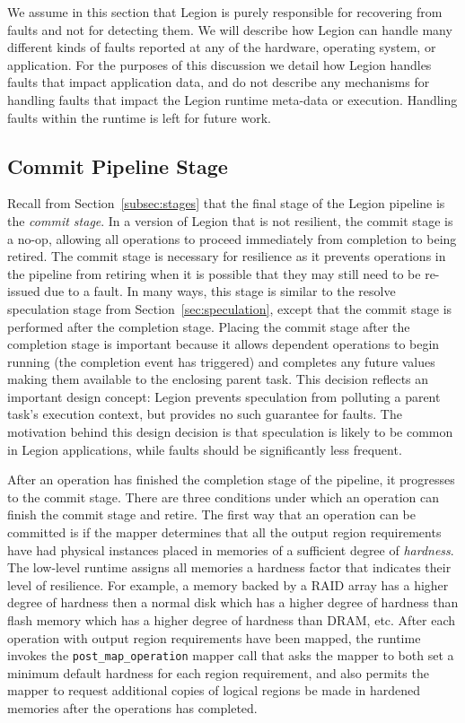 We assume in this section that Legion is purely responsible
for recovering from faults and not for detecting them. We
will describe how Legion can handle many different kinds
of faults reported at any of the hardware, operating system,
or application. For the purposes of this discussion we detail
how Legion handles faults that impact application data, and
do not describe any mechanisms for handling faults that 
impact the Legion runtime meta-data or execution. Handling
faults within the runtime is left for future work.

\subsection{Commit Pipeline Stage}
\label{subsec:commit}
Recall from Section~\ref{subsec:stages} that the final stage
of the Legion pipeline is the {\em commit stage}. In a
version of Legion that is not resilient, the commit stage
is a no-op, allowing all operations to proceed immediately
from completion to being retired. The commit stage is necessary
for resilience as it prevents operations in the pipeline from 
retiring when it is possible that they may still need
to be re-issued due to a fault. In many ways, this stage
is similar to the resolve speculation stage from 
Section~\ref{sec:speculation}, except that the commit stage
is performed after the completion stage. Placing the commit
stage after the completion stage is important because it
allows dependent operations to begin running (the completion
event has triggered) and completes any future values making
them available to the enclosing parent task. This decision
reflects an important design concept: Legion prevents speculation
from polluting a parent task's execution context, but provides
no such guarantee for faults. The motivation behind this
design decision is that speculation is likely to be common
in Legion applications, while faults should be significantly
less frequent.

After an operation has finished the completion stage of the 
pipeline, it progresses to the commit stage. There are three
conditions under which an operation can finish the commit
stage and retire. The first way that an operation can be
committed is if the mapper determines that all the output
region requirements have had physical instances placed in 
memories of a sufficient degree of {\em hardness}. The low-level
runtime assigns all memories a hardness factor that indicates
their level of resilience. For example, a memory backed by
a RAID array has a higher degree of hardness then a normal
disk which has a higher degree of hardness than flash memory
which has a higher degree of hardness than DRAM, etc. After
each operation with output region requirements have been 
mapped, the runtime invokes the {\tt post\_map\_operation}
mapper call that asks the mapper to both set a minimum
default hardness for each region requirement, and also permits
the mapper to request additional copies of logical regions
be made in hardened memories after the operations has completed. 

